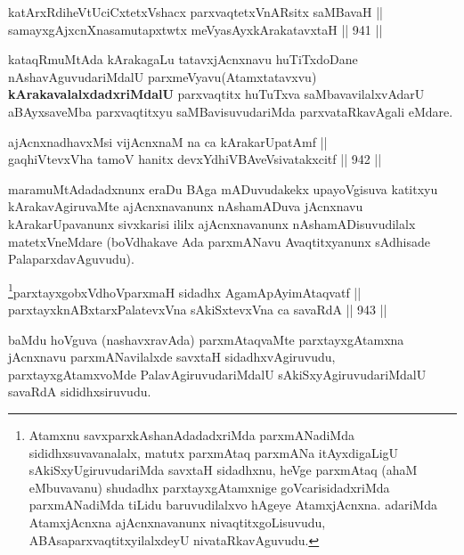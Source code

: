 \begin{shl}
katArxRdiheVtUciCxtetxVshacx parxvaqtetxVnARsitx saMBavaH || \\
samayxgAjxcnXnasamutapxtwtx meVyasAyxkArakatavxtaH \hfill || 941 ||  
\end{shl}

\begin{artha}
kataqRmuMtAda kArakagaLu tatavxjAcnxnavu huTiTxdoDane nAshavAguvudariMdalU parxmeVyavu(Atamxtatavxvu) \textbf{kArakavalalxdadxriMdalU} parxvaqtitx huTuTxva saMbavavilalxvAdarU aBAyxsaveMba parxvaqtitxyu saMBavisuvudariMda parxvataRkavAgali eMdare.
\end{artha}

\begin{shl}
ajAcnxnadhavxMsi vijAcnxnaM na ca kArakarUpatAmf || \\
gaqhiVtevxVha tamoV hanitx devxYdhiVBAveV\s sivatakxcitf \hfill || 942 ||  
\end{shl}

\begin{artha}
maramuMtAdadadxnunx eraDu BAga mADuvudakekx upayoVgisuva katitxyu kArakavAgiruvaMte ajAcnxnavanunx nAshamADuva jAcnxnavu kArakarUpavanunx sivxkarisi ililx ajAcnxnavanunx nAshamADisuvudilalx matetxVneMdare (boVdhakave Ada parxmANavu Avaqtitxyanunx sAdhisade PalaparxdavAguvudu).
\end{artha}


\begin{shl}
\footnote{Atamxnu savxparxkAshanAdadadxriMda parxmANadiMda sididhxsuvavanalalx, matutx parxmAtaq parxmANa itAyxdigaLigU sAkiSxyUgiruvudariMda savxtaH sidadhxnu, heVge parxmAtaq (ahaM eMbuvavanu) shudadhx parxtayxgAtamxnige goVcarisidadxriMda parxmANadiMda  tiLidu baruvudilalxvo hAgeye AtamxjAcnxna. adariMda AtamxjAcnxna ajAcnxnavanunx nivaqtitxgoLisuvudu, ABAsaparxvaqtitxyilalxdeyU nivataRkavAguvudu.}parxtayxgobxVdhoV\s parxmaH sidadhx AgamApAyimAtaqvatf || \\
parxtayxknABxtarxPalatevxVna sAkiSxtevxVna ca savaRdA \hfill || 943 ||  
\end{shl}

\begin{artha}
baMdu hoVguva (nashavxravAda) parxmAtaqvaMte parxtayxgAtamxna jAcnxnavu parxmANavilalxde savxtaH sidadhxvAgiruvudu, parxtayxgAtamxvoMde PalavAgiruvudariMdalU sAkiSxyAgiruvudariMdalU savaRdA sididhxsiruvudu.
\end{artha}


